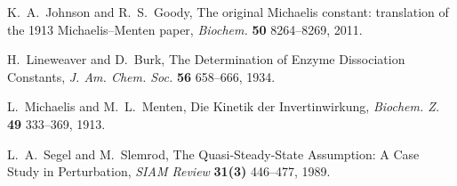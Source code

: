 \documentclass{article}
\begin{document}
\begin{thebibliography}{99}

K.~A.~Johnson and R.~S.~Goody,
The original Michaelis constant:
translation of the 1913 Michaelis--Menten paper,
{\it Biochem.} \textbf{50} 8264--8269, 2011.

H.~Lineweaver and D.~Burk,
The Determination of Enzyme Dissociation Constants,
{\it J. Am. Chem. Soc.} \textbf{56} 658--666, 1934.

L.~Michaelis and M.~L.~Menten,
Die Kinetik der Invertinwirkung,
{\it Biochem. Z.} \textbf{49} 333--369, 1913.

L.~A.~Segel and M.~Slemrod,
The Quasi-Steady-State Assumption:
A Case Study in Perturbation,
{\it SIAM Review} \textbf{31(3)} 446--477, 1989.

\end{thebibliography}
\end{document}

